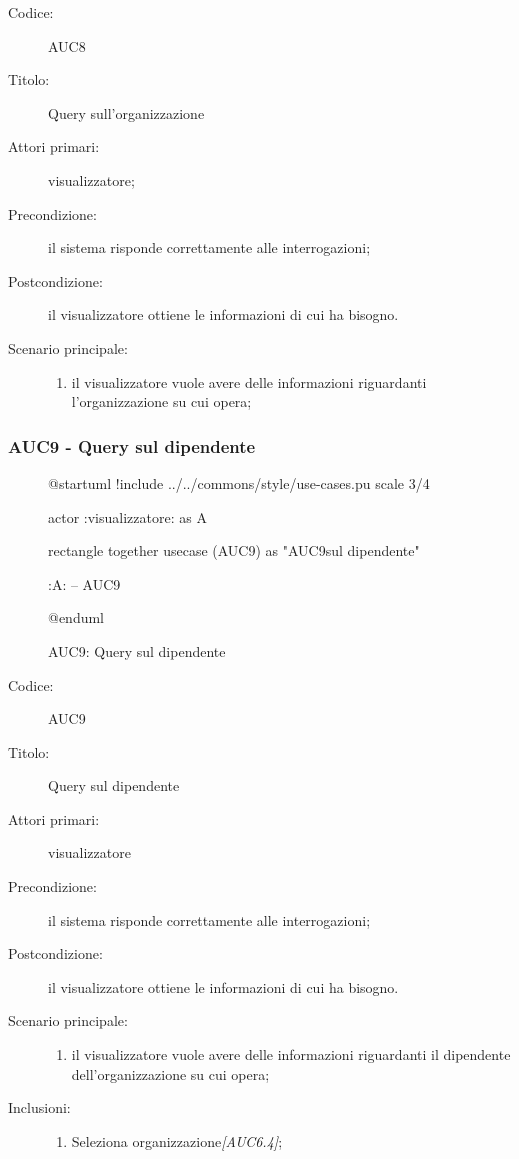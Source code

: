 \documentclass[casi-duso]{subfiles}
\begin{document}
\begin{description}
  \item[Codice:] AUC8
  \item[Titolo:] Query sull'organizzazione
  \item[Attori primari:] visualizzatore;
  \item[Precondizione:] il sistema risponde correttamente alle interrogazioni;
  \item[Postcondizione:] il visualizzatore ottiene le informazioni di cui ha bisogno.
  \item[Scenario principale:]
  \begin{enumerate}
    \item il visualizzatore vuole avere delle informazioni riguardanti l'organizzazione su cui opera;
  \end{enumerate}
\end{description}

\subsubsection{AUC9 - Query sul dipendente}%
\label{subsub:AUC9}

\begin{figure}[h!]
  \centering
  \begin{plantuml}
  @startuml
  !include ../../commons/style/use-cases.pu
  scale 3/4

  actor :visualizzatore: as A

  rectangle {
    together {
      usecase (AUC9) as "AUC9\nQuery sul dipendente"
    }
  }

  :A: -- AUC9

  @enduml
  \end{plantuml}
  \caption{AUC9: Query sul dipendente}
  \label{fig:auc9}
\end{figure}

\begin{description}
  \item[Codice:] AUC9
  \item[Titolo:] Query sul dipendente
  \item[Attori primari:] visualizzatore
  \item[Precondizione:] il sistema risponde correttamente alle interrogazioni;
  \item[Postcondizione:] il visualizzatore ottiene le informazioni di cui ha bisogno.
  \item[Scenario principale:]
  \begin{enumerate}
    \item il visualizzatore vuole avere delle informazioni riguardanti il dipendente dell'organizzazione su cui opera;
  \end{enumerate}
  \item[Inclusioni:]
  \begin{enumerate}
    \item Seleziona organizzazione\emph{[AUC6.4]};
  \end{enumerate}
\end{description}
\end{document}
